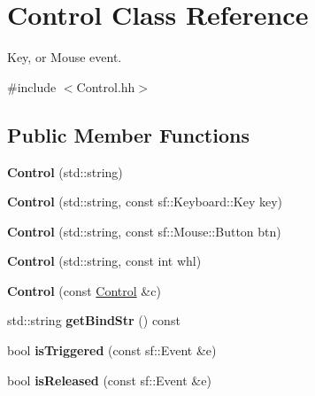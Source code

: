 \hypertarget{classControl}{}\section{Control Class Reference}
\label{classControl}


Key, or Mouse event.  




{\ttfamily \#include $<$Control.\+hh$>$}

\subsection*{Public Member Functions}
\begin{DoxyCompactItemize}
\item 
{\bfseries Control} (std\+::string)\hypertarget{classControl_a94fc7a98ac5b7a2121a8520a1395a3e4}{}\label{classControl_a94fc7a98ac5b7a2121a8520a1395a3e4}

\item 
{\bfseries Control} (std\+::string, const sf\+::\+Keyboard\+::\+Key key)\hypertarget{classControl_ae5830eb149d23f9b53b39323615d072d}{}\label{classControl_ae5830eb149d23f9b53b39323615d072d}

\item 
{\bfseries Control} (std\+::string, const sf\+::\+Mouse\+::\+Button btn)\hypertarget{classControl_a5d6af9adbe94c641806c6f946977ec8f}{}\label{classControl_a5d6af9adbe94c641806c6f946977ec8f}

\item 
{\bfseries Control} (std\+::string, const int whl)\hypertarget{classControl_a0161c7575f3cf302b4b4ba6161d6d318}{}\label{classControl_a0161c7575f3cf302b4b4ba6161d6d318}

\item 
{\bfseries Control} (const \hyperlink{classControl}{Control} \&c)\hypertarget{classControl_ae1520bca9129f40109cb5c0ef9835c52}{}\label{classControl_ae1520bca9129f40109cb5c0ef9835c52}

\item 
std\+::string {\bfseries get\+Bind\+Str} () const \hypertarget{classControl_a1f4f24fadb60842dffff80b714bf7ed8}{}\label{classControl_a1f4f24fadb60842dffff80b714bf7ed8}

\item 
bool {\bfseries is\+Triggered} (const sf\+::\+Event \&e)\hypertarget{classControl_ab58dcc314a5f88e2f49a78d5f4e29400}{}\label{classControl_ab58dcc314a5f88e2f49a78d5f4e29400}

\item 
bool {\bfseries is\+Released} (const sf\+::\+Event \&e)\hypertarget{classControl_a2b1d44aea6bc5adafceb7c0bc6b4820f}{}\label{classControl_a2b1d44aea6bc5adafceb7c0bc6b4820f}

\end{DoxyCompactItemize}

